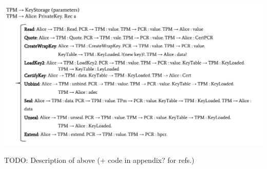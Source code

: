\begin{center}
\includegraphics[width=1.2\textwidth, angle=0]{Graphics/Global_Types.pdf}
\end{center}

TODO: Description of above (+ code in appendix? for refs.)